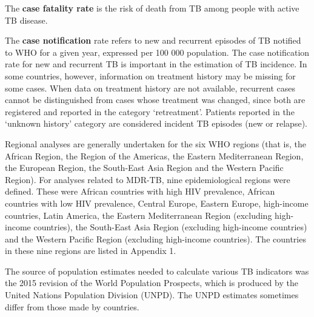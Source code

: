 The \textbf{case fatality rate} is the risk of death from TB among people with active TB disease.

The \textbf{case notification} rate refers to new and recurrent episodes of TB notified to WHO for a given year, expressed per 100 000 population. The case notification rate for new and recurrent TB is important in the estimation of TB incidence. In some countries, however, information on treatment history may be missing for some cases. When data on treatment history are not available, recurrent cases cannot be distinguished from cases whose treatment was changed, since both are registered and reported in the category ‘retreatment’. Patients reported in the ‘unknown history’ category are considered incident TB episodes (new or relapse). 

Regional analyses are generally undertaken for the six WHO regions (that is, the African Region, the Region of the Americas, the Eastern Mediterranean Region, the European Region, the South-East Asia Region and the Western Pacific Region). For analyses related to MDR-TB, nine epidemiological regions were defined. These were African countries with high HIV prevalence, African countries with low HIV prevalence, Central Europe, Eastern Europe, high-income countries, Latin America, the Eastern Mediterranean Region (excluding high-income countries), the South-East Asia Region (excluding high-income countries) and the Western Pacific Region (excluding high-income countries). The countries in these nine regions are listed in Appendix 1.

The source of population estimates needed to calculate various TB indicators was the 2015 revision of the World Population Prospects, which is produced by the United Nations Population Division (UNPD).  The UNPD estimates sometimes differ from those made by countries. 
  
  